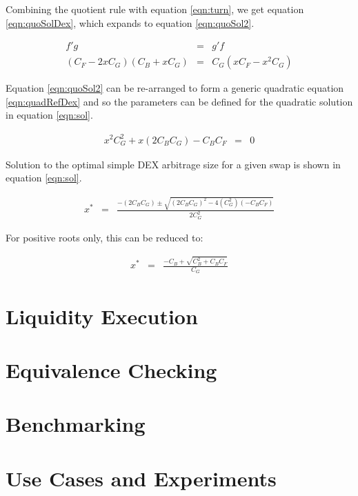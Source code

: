 \documentclass[runningheads]{llncs}
\begin{document}
	Combining the quotient rule with equation \ref{eqn:turn}, we get equation \ref{eqn:quoSolDex}, which expands to equation \ref{eqn:quoSol2}.
	
	\begin{eqnarray}
		f'g &=& g'f \label{eqn:quoSolDex}\\
		(C_{F} - 2 x C_{G})(C_{B} + x C_{G}) &=& C_{G} ( x C_{F} - x^2 C_{G}) \label{eqn:quoSol2}
	\end{eqnarray}
	
	Equation \ref{eqn:quoSol2} can be re-arranged to form a generic quadratic equation \ref{eqn:quadRefDex} and so the parameters can be defined for the quadratic solution in equation \ref{eqn:sol}.
	
	\begin{eqnarray}
		x^2 C_{G}^2 + x(2 C_{B} C_{G}) - C_{B} C_{F} &=& 0 \label{eqn:quadRefDex}
	\end{eqnarray}
	
	Solution to the optimal simple DEX arbitrage size for a given swap is shown in equation \ref{eqn:sol}.
	
	\begin{eqnarray}
		x^* &=& \frac{-(2 C_{B} C_{G}) \pm \sqrt{(2 C_{B} C_{G})^2 - 4(C_{G}^2)(- C_{B} C_{F})}}{2 C_{G}^2} \label{eqn:sol}
	\end{eqnarray}
	
	For positive roots only, this can be reduced to:
	
	\begin{eqnarray}
		x^* &=& \frac{- C_{B} + \sqrt{C_{B} ^2 + C_{B} C_{F}}}{C_{G}} \label{eqn:sol2}
	\end{eqnarray}
	

\section{Liquidity Execution}

\section{Equivalence Checking}

\section{Benchmarking}

\section{Use Cases and Experiments}
\end{document}
